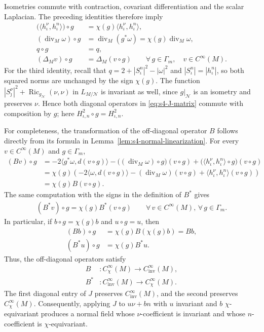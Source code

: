 \documentclass[a4paper,11pt,oneside,reqno]{amsart}
\numberwithin{equation}{section}
\theoremstyle{definition}
\begin{document}
Isometries commute with contraction, covariant
differentiation and the scalar Laplacian. The preceding
identities therefore imply
%
\begin{align*}
    \bigl(\langle h_\iota^\nu,h_\iota^n\rangle\bigr)\circ g
    &=\chi(g)\langle h_\iota^\nu,h_\iota^n\rangle,\\
    (\operatorname{div}_M\omega)\circ g
    &=\operatorname{div}_M(g^*\omega)
    =\chi(g)\operatorname{div}_M\omega,\\
    q\circ g&=q,\\
    (\Delta_Mv)\circ g&=\Delta_M(v\circ g)
    \qquad\forall\,g\in\Gamma_m,\quad v\in C^\infty(M).
\end{align*}
%
For the third identity, recall that
$q=2+|S_\iota^n|^2-|\omega|^2$ and
$|S_\iota^n|=|h_\iota^n|$, so both squared norms are
unchanged by the sign $\chi(g)$.
The function
$|S_\jmath^\nu|^2+
\operatorname{Ric}_{g_{\mathcal N}}(\nu,\nu)$ in
$L_{M/\mathcal N}$ is invariant as well, since
$g|_{\mathcal N}$ is an isometry and preserves $\nu$.
Hence both diagonal operators in \eqref{eq:s4-J-matrix}
commute with composition by $g$; here
$H_{\iota,n}^2\circ g=H_{\iota,n}^2$.

For completeness, the transformation of the
off-diagonal operator $B$ follows directly from its
formula in Lemma~\ref{lem:s4-normal-linearization}. For every
$v\in C^\infty(M)$ and $g\in\Gamma_m$,
%
\begin{align*}
    (Bv)\circ g
    &=-2\langle g^*\omega,d(v\circ g)\rangle
    -\bigl((\operatorname{div}_M\omega)\circ g\bigr)(v\circ g)
    +\bigl(\langle h_\iota^\nu,h_\iota^n\rangle\circ g\bigr)
    (v\circ g)\\
    &=\chi(g)\left(
    -2\langle\omega,d(v\circ g)\rangle
    -(\operatorname{div}_M\omega)(v\circ g)
    +\langle h_\iota^\nu,h_\iota^n\rangle(v\circ g)
    \right)\\
    &=\chi(g)B(v\circ g).
\end{align*}
%
The same computation with the signs in the definition
of $B^*$ gives
%
\begin{align*}
    (B^*v)\circ g=\chi(g)B^*(v\circ g)
    \qquad\forall\,v\in C^\infty(M),\,\forall\,g\in\Gamma_m.
\end{align*}
%
In particular, if $b\circ g=\chi(g)b$ and $u\circ g=u$,
then
%
\begin{align*}
    (Bb)\circ g&=\chi(g)B(\chi(g)b)=Bb,\\
    (B^*u)\circ g&=\chi(g)B^*u.
\end{align*}
%
Thus, the off-diagonal operators satisfy
%
\begin{align*}
    B &: C^\infty_\chi(M)\rightarrow
         C^\infty_{\mathrm{inv}}(M),\\
    B^* &: C^\infty_{\mathrm{inv}}(M)\rightarrow
           C^\infty_\chi(M).
\end{align*}
%
The first diagonal entry of $J$ preserves
$C^\infty_{\mathrm{inv}}(M)$, and the second preserves
$C^\infty_\chi(M)$. Consequently, applying $J$ to
$u\nu+bn$ with $u$ invariant and $b$ $\chi$-equivariant
produces a normal field whose $\nu$-coefficient is invariant
and whose $n$-coefficient is $\chi$-equivariant.
\end{document}
